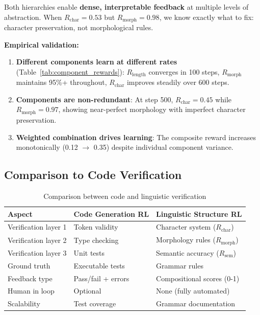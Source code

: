 \documentclass{article}
\newcommand{\Rchar}{R_{\text{char}}}
\newcommand{\Rmorph}{R_{\text{morph}}}
\newcommand{\Rsem}{R_{\text{sem}}}
\begin{document}
Both hierarchies enable \textbf{dense, interpretable feedback} at multiple levels of abstraction. When $\Rchar = 0.53$ but $\Rmorph = 0.98$, we know exactly what to fix: character preservation, not morphological rules.

\textbf{Empirical validation:}

\begin{enumerate}
    \item \textbf{Different components learn at different rates} (Table~\ref{tab:component_rewards}): $R_{\text{length}}$ converges in 100 steps, $\Rmorph$ maintains 95\%+ throughout, $\Rchar$ improves steadily over 600 steps.
    
    \item \textbf{Components are non-redundant}: At step 500, $\Rchar = 0.45$ while $\Rmorph = 0.97$, showing near-perfect morphology with imperfect character preservation.
    
    \item \textbf{Weighted combination drives learning}: The composite reward increases monotonically (0.12 $\rightarrow$ 0.35) despite individual component variance.
\end{enumerate}

\subsection{Comparison to Code Verification}

\begin{table}[t]
\centering
\caption{Comparison between code and linguistic verification}
\label{tab:code_comparison}
\small
\begin{tabular}{lll}
\toprule
\textbf{Aspect} & \textbf{Code Generation RL} & \textbf{Linguistic Structure RL} \\
\midrule
Verification layer 1 & Token validity & Character system ($\Rchar$) \\
Verification layer 2 & Type checking & Morphology rules ($\Rmorph$) \\
Verification layer 3 & Unit tests & Semantic accuracy ($\Rsem$) \\
Ground truth & Executable tests & Grammar rules \\
Feedback type & Pass/fail + errors & Compositional scores (0-1) \\
Human in loop & Optional & None (fully automated) \\
Scalability & Test coverage & Grammar documentation \\
\bottomrule
\end{tabular}
\end{table}
\end{document}
